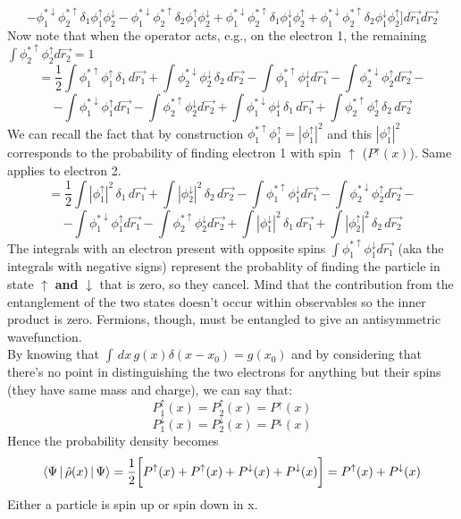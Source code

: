 \[
-\phi_1^{*\downarrow}\phi_2^{*\uparrow}\delta_1\phi_1^\uparrow\phi_2^\downarrow
-\phi_1^{*\downarrow}\phi_2^{*\uparrow}\delta_2\phi_1^\uparrow\phi_2^\downarrow
+\phi_1^{*\downarrow}\phi_2^{*\uparrow}\delta_1\phi_1^\downarrow\phi_2^\uparrow
+\phi_1^{*\downarrow}\phi_2^{*\uparrow}\delta_2\phi_1^\downarrow\phi_2^\uparrow
\bigg]d\vec{r_1}d\vec{r_2}
\]
Now note that when the operator acts, e.g., on the electron 1, the remaining $\int \phi_2^{*\uparrow}\phi_2^\uparrow d\vec{r_2}=1$
\[
=\frac{1}{2}\int \phi_1^{*\uparrow}\phi_1^\uparrow \,\delta_1\, d\vec{r_1}
+\int \phi_2^{*\downarrow}\phi_2^\downarrow\, \delta_2\, d\vec{r_2}
-\int \phi_1^{*\uparrow}\phi_1^\downarrow d\vec{r_1}
-\int \phi_2^{*\downarrow}\phi_2^\uparrow d\vec{r_2}-\]
\[
-\int \phi_1^{*\downarrow}\phi_1^\uparrow d\vec{r_1}
-\int \phi_2^{*\uparrow}\phi_2^\downarrow d\vec{r_2}
+\int \phi_1^{*\downarrow}\phi_1^\downarrow\, \delta_1\, d\vec{r_1}
+\int \phi_2^{*\uparrow}\phi_2^\uparrow\, \delta_2\, d\vec{r_2}
\]
We can recall the fact that by construction $\phi_1^{*\uparrow}\phi_1^\uparrow=|\phi_1^\uparrow|^2$  and this $|\phi_1^\uparrow|^2$ corresponds to the probability of finding electron 1 with spin $\uparrow$ ($P^\uparrow(x)$). Same applies to electron 2.\\
\[
=\frac{1}{2}\int |\phi_1^\uparrow|^2 \,\delta_1\, d\vec{r_1}
+\int |\phi_2^\downarrow|^2\, \delta_2\, d\vec{r_2}
-\int \phi_1^{*\uparrow}\phi_1^\downarrow d\vec{r_1}
-\int \phi_2^{*\downarrow}\phi_2^\uparrow d\vec{r_2}-\]
\[
-\int \phi_1^{*\downarrow}\phi_1^\uparrow d\vec{r_1}
-\int \phi_2^{*\uparrow}\phi_2^\downarrow d\vec{r_2}
+\int |\phi_1^\downarrow|^2\, \delta_1\, d\vec{r_1}
+\int |\phi_2^\uparrow|^2\, \delta_2\, d\vec{r_2}
\]
The integrals with an electron present with opposite spins $\int \phi_1^{*\uparrow}\phi_1^\downarrow d\vec{r_1}$ (aka the integrals with negative signs) represent the probablity of finding the particle in state $\uparrow$ \textbf{and} $\downarrow$ that is zero, so they cancel. Mind that the contribution from the entanglement of the two states doesn't occur within observables so the inner product is zero. Fermions, though, must be entangled to give an antisymmetric wavefunction.\\
By knowing that $\int\,dx\, g(x)\delta(x-x_0)=g(x_0)$ and by considering that there's no point in distinguishing the two electrons for anything but their spins (they have same mass and charge), we can say that:
\[P_1^\uparrow(x)=P_2^\uparrow(x)=P^\uparrow(x)\]
\[P_1^\downarrow(x)=P_2^\downarrow(x)=P^\downarrow(x)\]
Hence the probability density becomes
\[
\braket{\Psi\,|\,\hat{\rho}(x)\,|\,\Psi}=\frac{1}{2}\bigg[P^\uparrow(x)+P^\uparrow(x)+P^\downarrow(x)+P^\downarrow(x)\bigg]=P^\uparrow(x)+P^\downarrow(x)
\]
Either a particle is spin up or spin down in x.
